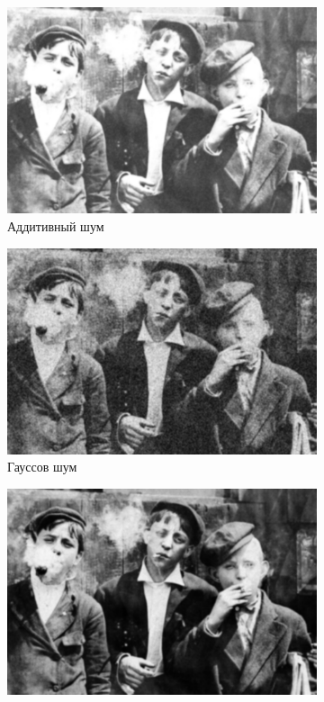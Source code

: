 \begin{figure}[ht]
\begin{subfigure}[b]{0.5\linewidth}
      \includegraphics[width=0.95\linewidth]{../Gaussian_Blur/Gaussian_Blur_Additive_noise_(11,11).jpg} 
      \caption{Аддитивный шум} 
      \label{gaussian_11:c} 
      \vspace{4ex}
    \end{subfigure}%
    \begin{subfigure}[b]{0.5\linewidth}
      \centering
      \includegraphics[width=0.95\linewidth]{../Gaussian_Blur/Gaussian_Blur_Gaussian_noise_(11,11).jpg} 
      \caption{Гауссов шум} 
      \label{gaussian_11:d} 
      \vspace{4ex}
    \end{subfigure}
    \begin{subfigure}[b]{0.5\linewidth}
      \centering
      \includegraphics[width=0.95\linewidth]{../Gaussian_Blur/Gaussian_Blur_Poisson_noise_(11,11).jpg} 

\end{subfigure}
\end{figure}
